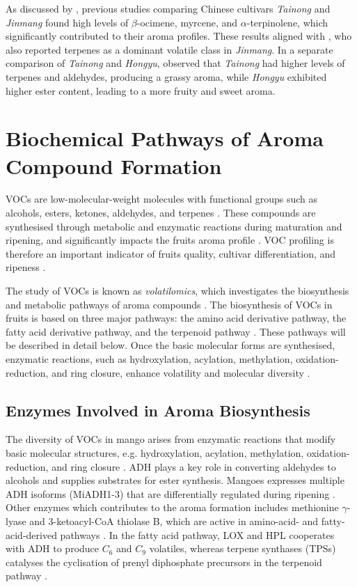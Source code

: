 \vspace{0.5em}
As discussed by \textcite{A16_Tandel2023}, previous studies comparing Chinese cultivars \textit{Tainong} and \textit{Jinmang} found high levels of $\beta$-ocimene, myrcene, and $\alpha$-terpinolene, which significantly contributed to their aroma profiles. These results aligned with \textcite{A15_Xie2023}, who also reported terpenes as a dominant volatile class in \textit{Jinmang}. In a separate comparison of \textit{Tainong} and \textit{Hongyu}, \textcite{A15_Xie2023} observed that \textit{Tainong} had higher levels of terpenes and aldehydes, producing a grassy aroma, while \textit{Hongyu} exhibited higher ester content, leading to a more fruity and sweet aroma.


\section{Biochemical Pathways of Aroma Compound Formation}
VOCs are low-molecular-weight molecules with functional groups such as alcohols, esters, ketones, aldehydes, and terpenes \cite*{A01_Aguirre-Lopez_2023,B01_TerpenesTerpenoids_2018}. These compounds are synthesised through metabolic and enzymatic reactions during maturation and ripening, and significantly impacts the fruits aroma profile \cite*{A01_Aguirre-Lopez_2023}. VOC profiling is therefore an important indicator of fruits quality, cultivar differentiation, and ripeness \cite*{A01_Aguirre-Lopez_2023}. 

\vspace{1em}
The study of VOCs is known as \textit{volatilomics}, which investigates the biosynthesis and metabolic pathways of aroma compounds \cite*{A01_Aguirre-Lopez_2023}. The biosynthesis of VOCs in fruits is based on three major pathways: the amino acid derivative pathway, the fatty acid derivative pathway, and the terpenoid pathway \cite*{A13_ElHadi2013}. These pathways will be described in detail below. Once the basic molecular forms are synthesised, enzymatic reactions, such as hydroxylation, acylation, methylation, oxidation-reduction, and ring closure, enhance volatility and molecular diversity \cite*{A13_ElHadi2013}.


\subsection{Enzymes Involved in Aroma Biosynthesis}
The diversity of VOCs in mango arises from enzymatic reactions that modify basic molecular structures, e.g. hydroxylation, acylation, methylation, oxidation-reduction, and ring closure \cite*{A13_ElHadi2013}. ADH plays a key role in converting aldehydes to alcohols and supplies substrates for ester synthesis. Mangoes expresses multiple ADH isoforms (MiADH1-3) that are differentially regulated during ripening \cite*{A10_Singh2010}. Other enzymes which contributes to the aroma formation includes methionine $\gamma$-lyase and 3-ketoacyl-CoA thiolase B, which are active in amino-acid- and fatty-acid-derived pathways \cite*{A05_Chin2019}. In the fatty acid pathway, LOX and HPL cooperates with ADH to produce $C_6$ and $C_9$ volatiles, whereas terpene synthases (TPSs) catalyses the cyclisation of prenyl diphosphate precursors in the terpenoid pathway \cite*{A13_ElHadi2013}.


